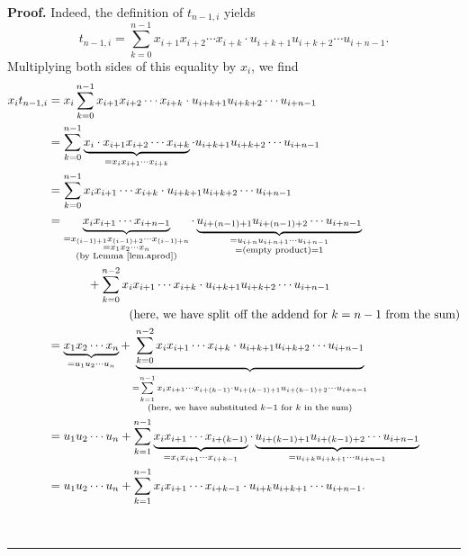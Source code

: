 \documentclass[numbers=enddot,12pt,final,onecolumn,notitlepage]{scrartcl}%
\theoremstyle{definition}
\newenvironment{proof}[1][Proof]{\noindent\textbf{#1.} }{\ \rule{0.5em}{0.5em}}
\let\sumnonlimits\sum
\renewcommand{\sum}{\sumnonlimits\limits}
\newenvironment{verlong}{}{}
\begin{document}
\begin{proof}
\begin{verlong}
Indeed, the definition of $t_{n-1,i}$ yields%
\[
t_{n-1,i}=\sum_{k=0}^{n-1}x_{i+1}x_{i+2}\cdots x_{i+k}\cdot u_{i+k+1}%
u_{i+k+2}\cdots u_{i+n-1}.
\]
Multiplying both sides of this equality by $x_{i}$, we find%
\begin{align}
x_{i}t_{n-1,i}  &  =x_{i}\sum_{k=0}^{n-1}x_{i+1}x_{i+2}\cdots x_{i+k}\cdot
u_{i+k+1}u_{i+k+2}\cdots u_{i+n-1}\nonumber\\
&  =\sum_{k=0}^{n-1}\underbrace{x_{i}\cdot x_{i+1}x_{i+2}\cdots x_{i+k}%
}_{=x_{i}x_{i+1}\cdots x_{i+k}}\cdot u_{i+k+1}u_{i+k+2}\cdots u_{i+n-1}%
\nonumber\\
&  =\sum_{k=0}^{n-1}x_{i}x_{i+1}\cdots x_{i+k}\cdot u_{i+k+1}u_{i+k+2}\cdots
u_{i+n-1}\nonumber\\
&  =\underbrace{x_{i}x_{i+1}\cdots x_{i+n-1}}_{\substack{=x_{\left(
i-1\right)  +1}x_{\left(  i-1\right)  +2}\cdots x_{\left(  i-1\right)
+n}\\=x_{1}x_{2}\cdots x_{n}\\\text{(by Lemma \ref{lem.aprod})}}%
}\cdot\underbrace{u_{i+\left(  n-1\right)  +1}u_{i+\left(  n-1\right)
+2}\cdots u_{i+n-1}}_{\substack{=u_{i+n}u_{i+n+1}\cdots u_{i+n-1}\\=\left(
\text{empty product}\right)  =1}}\nonumber\\
&  \ \ \ \ \ \ \ \ \ \ +\sum_{k=0}^{n-2}x_{i}x_{i+1}\cdots x_{i+k}\cdot
u_{i+k+1}u_{i+k+2}\cdots u_{i+n-1}\nonumber\\
&  \ \ \ \ \ \ \ \ \ \ \ \ \ \ \ \ \ \ \ \ \left(  \text{here, we have split
off the addend for }k=n-1\text{ from the sum}\right) \nonumber\\
&  =\underbrace{x_{1}x_{2}\cdots x_{n}}_{=u_{1}u_{2}\cdots u_{n}%
}+\underbrace{\sum_{k=0}^{n-2}x_{i}x_{i+1}\cdots x_{i+k}\cdot u_{i+k+1}%
u_{i+k+2}\cdots u_{i+n-1}}_{\substack{=\sum_{k=1}^{n-1}x_{i}x_{i+1}\cdots
x_{i+\left(  k-1\right)  }\cdot u_{i+\left(  k-1\right)  +1}u_{i+\left(
k-1\right)  +2}\cdots u_{i+n-1}\\\text{(here, we have substituted }k-1\text{
for }k\text{ in the sum)}}}\nonumber\\
&  =u_{1}u_{2}\cdots u_{n}+\sum_{k=1}^{n-1}\underbrace{x_{i}x_{i+1}\cdots
x_{i+\left(  k-1\right)  }}_{=x_{i}x_{i+1}\cdots x_{i+k-1}}\cdot
\underbrace{u_{i+\left(  k-1\right)  +1}u_{i+\left(  k-1\right)  +2}\cdots
u_{i+n-1}}_{=u_{i+k}u_{i+k+1}\cdots u_{i+n-1}}\nonumber\\
&  =u_{1}u_{2}\cdots u_{n}+\sum_{k=1}^{n-1}x_{i}x_{i+1}\cdots x_{i+k-1}\cdot
u_{i+k}u_{i+k+1}\cdots u_{i+n-1}. \label{pf.prop.f.equal-case.1}%
\end{align}



\end{verlong}
\end{proof}
\end{document}
